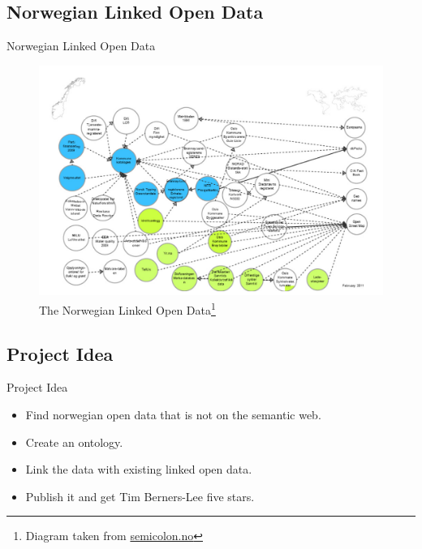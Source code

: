 \documentclass{beamer}
\begin{document}
	\subsection{Norwegian Linked Open Data}
	\begin{frame}{Norwegian Linked Open Data}
		\begin{figure}
			\includegraphics[scale=0.19]{resources/norwegian-lod.png}
			\caption{The Norwegian Linked Open Data\footnote[frame]{%
				Diagram taken from \url{semicolon.no} }}
		\end{figure}
	\end{frame}

	\subsection{Project Idea}
	\begin{frame}{Project Idea}
		\begin{itemize}
			\item Find norwegian open data that is not on the semantic web.
			\item Create an ontology.
			\item Link the data with existing linked open data.
			\item Publish it and get Tim Berners-Lee five stars.
		\end{itemize}
	\end{frame}
\end{document}
